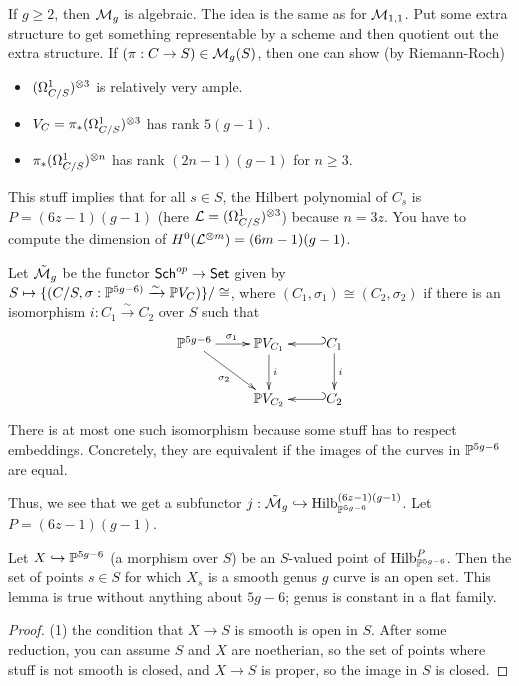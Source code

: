  \begin{example}
   If $g\ge 2$, then $\mathcal{M}_g$ is algebraic. The idea is the same as for $\mathcal{M}_{1,1}$. Put
   some extra structure to get something representable by a scheme and then quotient out
   the extra structure. If $(\pi:C\to S)\in \mathcal{M}_g(S)$, then one can show (by Riemann-Roch)
   \begin{itemize}
     \item $(\Omega^1_{C/S})^{\otimes 3}$ is relatively very ample.
     \item $V_C=\pi_*(\Omega_{C/S}^{1})^{\otimes 3}$ has rank $5(g-1)$.
     \item $\pi_*(\Omega^1_{C/S})^{\otimes n}$ has rank $(2n-1)(g-1)$ for $n\ge 3$.
   \end{itemize}
   This stuff implies that for all $s\in S$, the Hilbert polynomial of $C_s$ is
   $P=(6z-1)(g-1)$ (here $\mathcal{L}=(\Omega^1_{C/S})^{\otimes 3}$) because $n=3z$. You have to
   compute the dimension of $H^0(\mathcal{L}^{\otimes m})= (6m-1)(g-1)$.

   Let $\tilde {\mathcal{M}}_g$ be the functor $\text{\sf Sch}^{op}\to \text{\sf Set}$ given by $S\mapsto
   \{(C/S,\sigma:\mathbb{P}^{5g-6)}\xrightarrow\sim \mathbb{P} V_C)\}/\cong$, where
   $(C_1,\sigma_1)\cong (C_2,\sigma_2)$ if there is an isomorphism $i:C_1\xrightarrow\sim
   C_2$ over $S$ such that
   \[\xymatrix{
    \PP^{5g-6}\ar[r]^{\sigma_1}\ar[dr]_{\sigma_2} & \PP V_{C_1}\ar[d]^{i} & C_1 \ar@{_(->}[l]\ar[d]^i\\
    & \PP V_{C_2} & C_2 \ar@{_(->}[l]
   }\]
   There is at most one such isomorphism because some stuff has to respect embeddings.
   Concretely, they are equivalent if the images of the curves in $\mathbb{P}^{5g-6}$ are
   equal.

   Thus, we see that we get a subfunctor $j:\tilde {\mathcal{M}}_g\hookrightarrow
   \operatorname{Hilb}^{(6z-1)(g-1)}_{\mathbb{P}^{5g-6}}$. Let $P=(6z-1)(g-1)$.
   \begin{lemma}
     Let $X\hookrightarrow \mathbb{P}^{5g-6}$ (a morphism over $S$) be an $S$-valued point of
     $\operatorname{Hilb}^P_{\mathbb{P}^{5g-6}}$. Then the set of points $s\in S$ for which $X_s$ is a smooth
     genus $g$ curve is an open set. This lemma is true without anything about $5g-6$;
     genus is constant in a flat family.
   \end{lemma}
   \begin{proof}
     (1) the condition that $X\to S$ is smooth is open in $S$. After some reduction, you
     can assume $S$ and $X$ are noetherian, so the set of points where stuff is not
     smooth is closed, and $X\to S$ is proper, so the image in $S$ is closed.


\end{proof}
\end{example}
